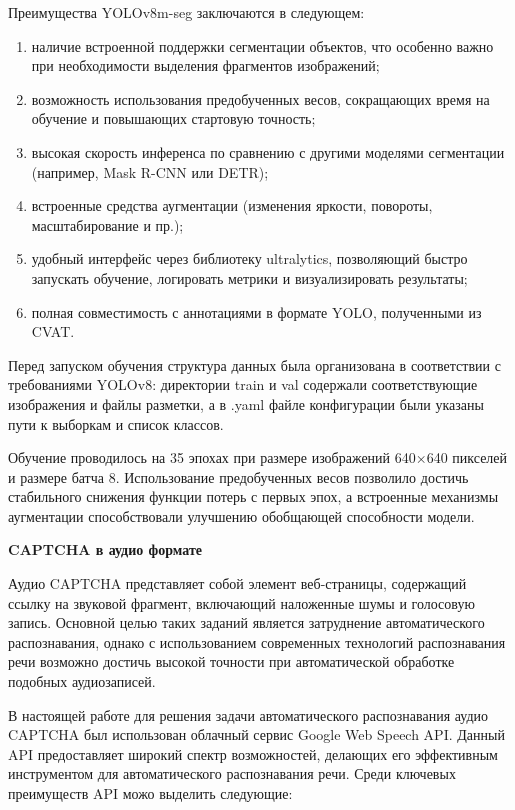 Преимущества YOLOv8m-seg заключаются в следующем:

\begin{enumerate}
    \item наличие встроенной поддержки сегментации объектов, что особенно важно 
    при необходимости выделения фрагментов изображений;
    \item возможность использования предобученных весов, сокращающих время на 
    обучение и повышающих стартовую точность;
    \item высокая скорость инференса по сравнению с другими моделями сегментации 
    (например, Mask R-CNN или DETR);
    \item встроенные средства аугментации (изменения яркости, повороты, 
    масштабирование и пр.);
    \item удобный интерфейс через библиотеку ultralytics, позволяющий быстро 
    запускать обучение, логировать метрики и визуализировать результаты;
    \item полная совместимость с аннотациями в формате YOLO, полученными из CVAT.
\end{enumerate}

Перед запуском обучения структура данных была организована в соответствии с 
требованиями YOLOv8: директории train и val содержали соответствующие изображения 
и файлы разметки, а в .yaml файле конфигурации были указаны пути к выборкам и 
список классов.

Обучение проводилось на 35 эпохах при размере изображений 640×640 пикселей и 
размере батча 8. Использование предобученных весов позволило достичь стабильного 
снижения функции потерь с первых эпох, а встроенные механизмы аугментации 
способствовали улучшению обобщающей способности модели.

\textbf{CAPTCHA в аудио формате}

Аудио CAPTCHA представляет собой элемент веб-страницы, содержащий ссылку на 
звуковой фрагмент, включающий наложенные шумы и голосовую запись. Основной целью 
таких заданий является затруднение автоматического распознавания, однако с 
использованием современных технологий распознавания речи возможно достичь высокой 
точности при автоматической обработке подобных аудиозаписей.

В настоящей работе для решения задачи автоматического распознавания аудио CAPTCHA 
был использован облачный сервис Google Web Speech API. Данный API предоставляет 
широкий спектр возможностей, делающих его эффективным инструментом для 
автоматического распознавания речи. Среди ключевых преимуществ API можо выделить 
следующие:

